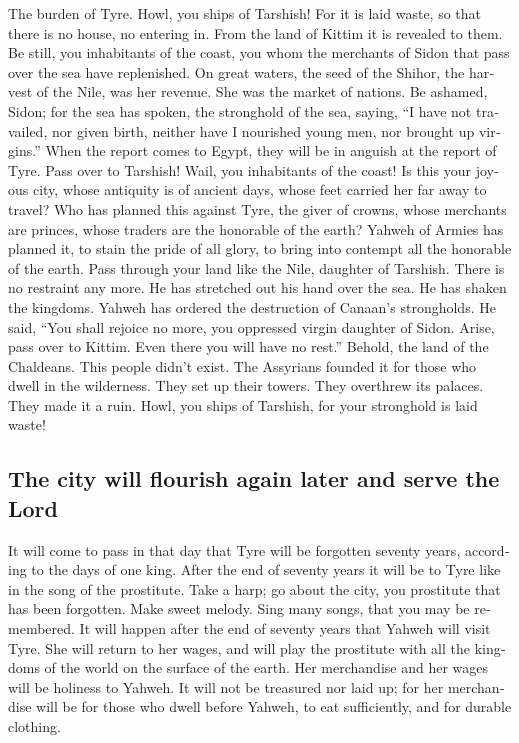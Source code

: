 \begin{paracol}{2}
\begin{otherlanguage}{english}
 The burden of Tyre. Howl, you ships of Tarshish! For it
is laid waste, so that there is no house, no entering in. From the land
of Kittim it is revealed to them.  Be still, you
inhabitants of the coast, you whom the merchants of Sidon that pass over
the sea have replenished.  On great waters, the seed of
the Shihor, the harvest of the Nile, was her revenue. She was the market
of nations.  Be ashamed, Sidon; for the sea has spoken,
the stronghold of the sea, saying, ``I have not travailed, nor given
birth, neither have I nourished young men, nor brought up virgins.''
 When the report comes to Egypt, they will be in anguish
at the report of Tyre.  Pass over to Tarshish! Wail, you
inhabitants of the coast!  Is this your joyous city, whose
antiquity is of ancient days, whose feet carried her far away to travel?
 Who has planned this against Tyre, the giver of crowns,
whose merchants are princes, whose traders are the honorable of the
earth?  Yahweh of Armies has planned it, to stain the
pride of all glory, to bring into contempt all the honorable of the
earth.  Pass through your land like the Nile, daughter of
Tarshish. There is no restraint any more.  He has
stretched out his hand over the sea. He has shaken the kingdoms. Yahweh
has ordered the destruction of Canaan's strongholds.  He
said, ``You shall rejoice no more, you oppressed virgin daughter of
Sidon. Arise, pass over to Kittim. Even there you will have no rest.''
 Behold, the land of the Chaldeans. This people didn't
exist. The Assyrians founded it for those who dwell in the wilderness.
They set up their towers. They overthrew its palaces. They made it a
ruin.  Howl, you ships of Tarshish, for your stronghold
is laid waste!

\hypertarget{the-city-will-flourish-again-later-and-serve-the-lord}{%
\subsection{The city will flourish again later and serve the
Lord}\label{the-city-will-flourish-again-later-and-serve-the-lord}}

 It will come to pass in that day that Tyre will be
forgotten seventy years, according to the days of one king. After the
end of seventy years it will be to Tyre like in the song of the
prostitute.  Take a harp; go about the city, you
prostitute that has been forgotten. Make sweet melody. Sing many songs,
that you may be remembered.  It will happen after the end
of seventy years that Yahweh will visit Tyre. She will return to her
wages, and will play the prostitute with all the kingdoms of the world
on the surface of the earth.  Her merchandise and her
wages will be holiness to Yahweh. It will not be treasured nor laid up;
for her merchandise will be for those who dwell before Yahweh, to eat
sufficiently, and for durable clothing.


\end{otherlanguage}
\end{paracol}
